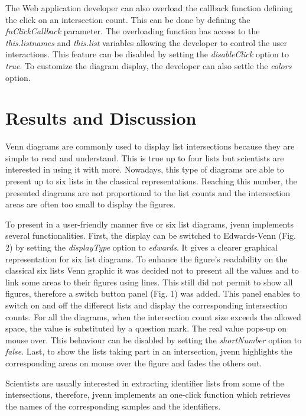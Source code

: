 \documentclass{bmcart}
\begin{document}
The Web application developer can also overload the callback function defining the click on an intersection count. This can be done by defining 
the \textit{fnClickCallback} parameter. The overloading function has access to the \textit{this.listnames} and \textit{this.list} variables 
allowing the developer to control the user interactions. This feature can be disabled by setting the \textit{disableClick} option to \textit{true}. 
To customize the diagram display, the developer can also settle the \textit{colors} option.


\section*{Results and Discussion}

Venn diagrams are commonly used to display list intersections because they are simple to read and understand. This is true up to four lists but 
scientists are interested in using it with more. Nowadays, this type of diagrams are able to present up to six lists in the classical representations.
Reaching this number, the presented diagrams are not proportional to the list counts and the intersection areas are often too small to display the 
figures. 

To present in a user-friendly manner five or six list diagrams, jvenn implements several functionalities. First, the display can be switched to
Edwards-Venn (Fig. 2) by setting the \textit{displayType} option to \textit{edwards}. It gives a clearer graphical representation for six list
diagrams. To enhance the figure's readability on the classical six lists Venn graphic it was decided not to present all the values and to link some areas
to their figures using lines. This still did not permit to show all figures, therefore a switch button panel (Fig. 1) was added. This panel enables 
to switch on and off the different lists and display the corresponding intersection counts. For all the diagrams, when the intersection count size 
exceeds the allowed space, the value is substituted by a question mark. The real value pops-up on mouse over. This behaviour can be disabled by setting 
the \textit{shortNumber} option to \textit{false}. Last, to show the lists taking part in an intersection, jvenn highlights the corresponding areas on
mouse over the figure and fades the others out.

Scientists are usually interested in extracting identifier lists from some of the intersections, therefore, jvenn implements an one-click function which 
retrieves the names of the corresponding samples and the identifiers.
\end{document}
